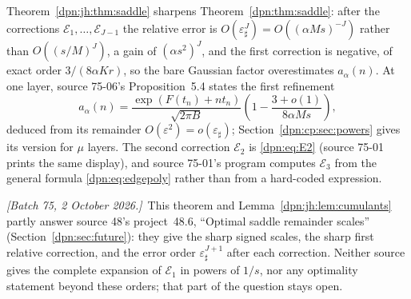 \documentclass[11pt]{article}
\numberwithin{equation}{section}
\theoremstyle{definition}\newtheorem{definition}[theorem]{Definition}
\theoremstyle{remark}\newtheorem{remark}[theorem]{Remark}
\newcommand{\eps}{\varepsilon}
\newcommand{\writenote}[1]{\par\smallskip\noindent\textit{[Batch 75, 2 October 2026.]}\ #1\par\smallskip}
\newcommand{\epsh}{\varepsilon_{\sharp}}
\begin{document}
Theorem~\ref{dpn:jh:thm:saddle} sharpens Theorem~\ref{dpn:thm:saddle}: after
the corrections $\mathcal E_1,\dots,\mathcal E_{J-1}$ the relative error is
$O(\epsh^J)=O((\alpha Ms)^{-J})$ rather than $O((s/M)^J)$, a gain of
$(\alpha s^2)^J$, and the first correction is negative, of exact order
$3/(8\alpha Kr)$, so the bare Gaussian factor overestimates $a_\alpha(n)$.  At
one layer, source 75-06's Proposition~5.4 states the first refinement
\[
 a_\alpha(n)=\frac{\exp(F(t_n)+nt_n)}{\sqrt{2\pi B}}
 \left(1-\frac{3+o(1)}{8\alpha Ms}\right),
\]
deduced from its remainder $O(\eps^2)=o(\epsh)$; Section~\ref{dpn:cp:sec:powers}
gives its version for $\mu$ layers.  The second correction $\mathcal E_2$ is
\eqref{dpn:eq:E2} (source 75-01 prints the same display), and source 75-01's
program computes $\mathcal E_3$ from the general formula
\eqref{dpn:eq:edgepoly} rather than from a hard-coded expression.

\writenote{This theorem and Lemma~\ref{dpn:jh:lem:cumulants} partly answer
source 48's project~48.6, ``Optimal saddle remainder scales''
(Section~\ref{dpn:sec:future}): they give the sharp signed scales, the sharp
first relative correction, and the error order $\epsh^{J+1}$ after each
correction.  Neither source gives the complete expansion of $\mathcal E_1$ in
powers of $1/s$, nor any optimality statement beyond these orders; that part
of the question stays open.}
\end{document}
